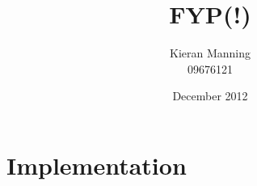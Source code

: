 \documentclass[11pt]{article}
\title{\textbf{FYP(!)}}
\author{Kieran Manning \\ 09676121}
\date{December 2012}
\begin{document}


\pagebreak



\thispagestyle{empty}

\tableofcontents 

\newpage

 

\newpage



\newpage




\pagebreak



\pagebreak



\pagebreak



\pagebreak

\section{Implementation}
\end{document}

